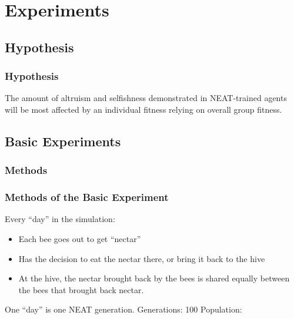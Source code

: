 \documentclass{beamer}
\begin{document}


  \section{Experiments} %
  \label{sec:experiments}
    \subsection{Hypothesis} %
    \label{sub:hypothesis}

      \begin{frame}[c]\frametitle{Hypothesis}
          
          The amount of altruism and selfishness demonstrated in NEAT-trained
          agents will be most affected by an individual fitness relying
          on overall group fitness.
      
      \end{frame}
    

    \subsection{Basic Experiments} %
    \label{sub:basic_experiments}
    
      \subsubsection{Methods} %
      \label{ssub:methods}
      
        \begin{frame}[c]\frametitle{Methods of the Basic Experiment}
          Every ``day'' in the simulation:
          \begin{itemize}
            \item Each bee goes out to get ``nectar''
            \item Has the decision to eat the nectar there, or bring it 
                  back to the hive
            \item At the hive, the nectar brought back by the bees is 
                  shared equally between the bees that brought back nectar.
            \end{itemize}
            One ``day'' is one NEAT generation.
            Generations: 100
            Population: 
        
        \end{frame}
\end{document}
